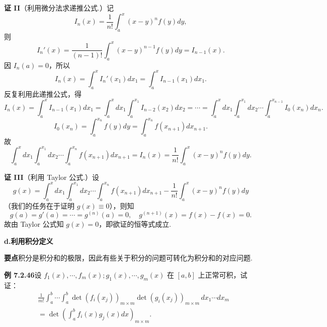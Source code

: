 \documentclass[UTF8,12pt,a4paper,fontset=fandol]{ctexart}
\begin{document}
\noindent\textbf{证 II}\quad （利用微分法求递推公式.）记
\[
I_n(x)=\frac1{n!}\int_a^x(x-y)^nf(y)dy,
\]
则
\[
I_n'(x)=\frac1{(n-1)!}\int_a^x(x-y)^{n-1}f(y)dy=I_{n-1}(x).
\]
因 $I_n(a)=0$，所以
\[
I_n(x)=\int_a^x I_n'(x_1)dx_1=\int_a^x I_{n-1}(x_1)dx_1.
\]
反复利用此递推公式，得
\[
I_n(x)=\int_a^x I_{n-1}(x_1)dx_1
=\int_a^x dx_1\int_a^{x_1}I_{n-2}(x_2)dx_2
=\cdots=\int_a^x dx_1\int_a^{x_1}dx_2\cdots
\int_a^{x_{n-1}}I_0(x_n)dx_n.
\]
\[
I_0(x_n)=\int_a^{x_n}f(y)dy=\int_a^{x_n}f(x_{n+1})dx_{n+1}.
\]
故
\[
\int_a^x dx_1\int_a^{x_1}dx_2\cdots\int_a^{x_n}f(x_{n+1})dx_{n+1}
=I_n(x)=\frac1{n!}\int_a^x(x-y)^nf(y)dy.
\]

\noindent\textbf{证 III}\quad （利用 Taylor 公式.）设
\[
g(x)=\int_a^x dx_1\int_a^{x_1}dx_2\cdots\int_a^{x_n}f(x_{n+1})dx_{n+1}
-\frac1{n!}\int_a^x(x-y)^nf(y)dy
\]
（我们的任务在于证明 $g(x)\equiv0$），则知
\[
g(a)=g'(a)=\cdots=g^{(n)}(a)=0,\quad g^{(n+1)}(x)=f(x)-f(x)=0.
\]
故由 Taylor 公式知 $g(x)=0$，即欲证的恒等式成立.

\noindent\textbf{d.\quad 利用积分定义}

\noindent\textbf{要点}\quad 积分是积分和的极限，因此有些关于积分的问题可转化为积分和的对应问题.

\noindent\textbf{例 7.2.46}\quad 设 $f_1(x),\cdots,f_m(x);g_1(x),\cdots,g_m(x)$ 在 $[a,b]$ 上正常可积，试证：
\[
\begin{aligned}
&\frac1{m!}\int_a^b\cdots\int_a^b
\det(f_i(x_j))_{m\times m}\det(g_i(x_j))_{m\times m}\,dx_1\cdots dx_m\\
&=\det\left(\int_a^b f_i(x)g_j(x)dx\right)_{m\times m}.
\end{aligned} \tag{1}
\]
\end{document}
